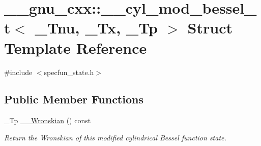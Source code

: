 \hypertarget{struct____gnu__cxx_1_1____cyl__mod__bessel__t}{}\section{\+\_\+\+\_\+gnu\+\_\+cxx\+:\+:\+\_\+\+\_\+cyl\+\_\+mod\+\_\+bessel\+\_\+t$<$ \+\_\+\+Tnu, \+\_\+\+Tx, \+\_\+\+Tp $>$ Struct Template Reference}
\label{struct____gnu__cxx_1_1____cyl__mod__bessel__t}


{\ttfamily \#include $<$specfun\+\_\+state.\+h$>$}

\subsection*{Public Member Functions}
\begin{DoxyCompactItemize}
\item 
\+\_\+\+Tp \hyperlink{struct____gnu__cxx_1_1____cyl__mod__bessel__t_a4e9bbc7f2cac91b245fda66b113fd5ac}{\+\_\+\+\_\+\+Wronskian} () const
\begin{DoxyCompactList}\small\item\em Return the Wronskian of this modified cylindrical Bessel function state. \end{DoxyCompactList}\end{DoxyCompactItemize}
